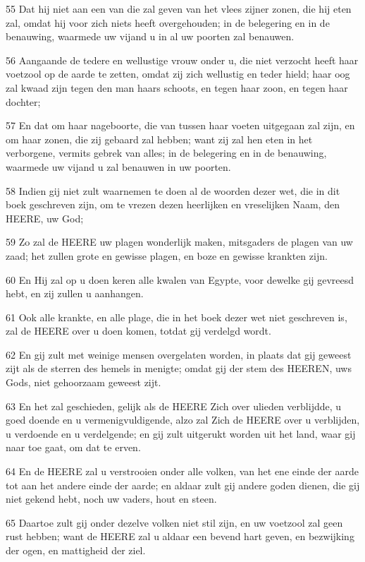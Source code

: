 \par 55 Dat hij niet aan een van die zal geven van het vlees zijner zonen, die hij eten zal, omdat hij voor zich niets heeft overgehouden; in de belegering en in de benauwing, waarmede uw vijand u in al uw poorten zal benauwen.
\par 56 Aangaande de tedere en wellustige vrouw onder u, die niet verzocht heeft haar voetzool op de aarde te zetten, omdat zij zich wellustig en teder hield; haar oog zal kwaad zijn tegen den man haars schoots, en tegen haar zoon, en tegen haar dochter;
\par 57 En dat om haar nageboorte, die van tussen haar voeten uitgegaan zal zijn, en om haar zonen, die zij gebaard zal hebben; want zij zal hen eten in het verborgene, vermits gebrek van alles; in de belegering en in de benauwing, waarmede uw vijand u zal benauwen in uw poorten.
\par 58 Indien gij niet zult waarnemen te doen al de woorden dezer wet, die in dit boek geschreven zijn, om te vrezen dezen heerlijken en vreselijken Naam, den HEERE, uw God;
\par 59 Zo zal de HEERE uw plagen wonderlijk maken, mitsgaders de plagen van uw zaad; het zullen grote en gewisse plagen, en boze en gewisse krankten zijn.
\par 60 En Hij zal op u doen keren alle kwalen van Egypte, voor dewelke gij gevreesd hebt, en zij zullen u aanhangen.
\par 61 Ook alle krankte, en alle plage, die in het boek dezer wet niet geschreven is, zal de HEERE over u doen komen, totdat gij verdelgd wordt.
\par 62 En gij zult met weinige mensen overgelaten worden, in plaats dat gij geweest zijt als de sterren des hemels in menigte; omdat gij der stem des HEEREN, uws Gods, niet gehoorzaam geweest zijt.
\par 63 En het zal geschieden, gelijk als de HEERE Zich over ulieden verblijdde, u goed doende en u vermenigvuldigende, alzo zal Zich de HEERE over u verblijden, u verdoende en u verdelgende; en gij zult uitgerukt worden uit het land, waar gij naar toe gaat, om dat te erven.
\par 64 En de HEERE zal u verstrooien onder alle volken, van het ene einde der aarde tot aan het andere einde der aarde; en aldaar zult gij andere goden dienen, die gij niet gekend hebt, noch uw vaders, hout en steen.
\par 65 Daartoe zult gij onder dezelve volken niet stil zijn, en uw voetzool zal geen rust hebben; want de HEERE zal u aldaar een bevend hart geven, en bezwijking der ogen, en mattigheid der ziel.
